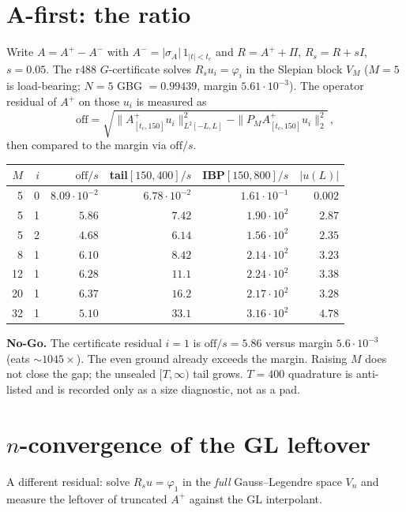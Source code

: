 \documentclass[11pt]{article}
\theoremstyle{remark}
\begin{document}
\section{A-first: the ratio}

Write $A=A^+-A^-$ with
$A^-=|\sigma_A|\,1_{|t|<t_c}$
and $R=A^++\Pi$, $R_s=R+sI$, $s=0.05$.
The r488 $G$-certificate solves
$R_su_i=\varphi_i$ in the Slepian block $V_M$
($M=5$ is load-bearing; $N=5$ GBG $=0.99439$,
margin $5.61\cdot10^{-3}$).
The operator residual of $A^+$ on those $u_i$
is measured as
\[
  \mathrm{off}
  =\sqrt{\|A^+_{[t_c,150]}u_i\|_{L^2[-L,L]}^2
         -\|P_MA^+_{[t_c,150]}u_i\|_2^2}\,,
\]
then compared to the margin via $\mathrm{off}/s$.

\begin{center}
\small
\begin{tabular}{@{}rrrrrr@{}}
\toprule
$M$ & $i$ & $\mathrm{off}/s$
  & tail$[150,400]/s$
  & IBP$[150,800]/s$
  & $|u(L)|$ \\
\midrule
5 & 0 & $8.09\cdot10^{-2}$ & $6.78\cdot10^{-2}$
  & $1.61\cdot10^{-1}$ & $0.002$ \\
5 & 1 & $5.86$ & $7.42$
  & $1.90\cdot10^{2}$ & $2.87$ \\
5 & 2 & $4.68$ & $6.14$
  & $1.56\cdot10^{2}$ & $2.35$ \\
8 & 1 & $6.10$ & $8.42$
  & $2.14\cdot10^{2}$ & $3.23$ \\
12 & 1 & $6.28$ & $11.1$
  & $2.24\cdot10^{2}$ & $3.38$ \\
20 & 1 & $6.37$ & $16.2$
  & $2.17\cdot10^{2}$ & $3.28$ \\
32 & 1 & $5.10$ & $33.1$
  & $3.16\cdot10^{2}$ & $4.78$ \\
\bottomrule
\end{tabular}
\end{center}

\noindent
\textbf{No-Go.}
The certificate residual $i=1$ is
$\mathrm{off}/s=5.86$ versus margin $5.6\cdot10^{-3}$
(eats $\sim1045\times$).
The even ground already exceeds the margin.
Raising $M$ does not close the gap;
the unsealed $[T,\infty)$ tail grows.
$T=400$ quadrature is anti-listed and is
recorded only as a size diagnostic,
not as a pad.

\section{$n$-convergence of the GL leftover}

A different residual: solve $R_su=\varphi_1$ in
the \emph{full} Gauss--Legendre space $V_n$
and measure the leftover of truncated $A^+$
against the GL interpolant.
\end{document}
